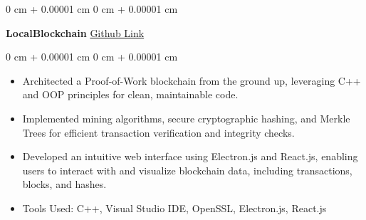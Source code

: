 \documentclass[10pt, letterpaper]{article}
\newenvironment{highlights}{
    \begin{itemize}[
        topsep=0.10 cm,
        parsep=0.10 cm,
        partopsep=0pt,
        itemsep=0pt,
        leftmargin=0 cm + 10pt
    ]
}{
    \end{itemize}
}
\newenvironment{onecolentry}{
    \begin{adjustwidth}{
        0 cm + 0.00001 cm
    }{
        0 cm + 0.00001 cm
    }
}{
    \end{adjustwidth}
}
\newenvironment{twocolentry}[2][]{
    \onecolentry
    \def\secondColumn{#2}
    \setcolumnwidth{\fill, 4.5 cm}
    \begin{paracol}{2}
}{
    \switchcolumn \raggedleft \secondColumn
    \end{paracol}
    \endonecolentry
}
\begin{document}
        \vspace{0.2 cm}

        \begin{twocolentry}{
            \href{https://github.com/anshmehta7x/SimpleBlockchain}{Github Link}
        }
            \textbf{LocalBlockchain}\end{twocolentry}

        \vspace{0.10 cm}
        \begin{onecolentry}
            \begin{highlights}
                \item Architected a Proof-of-Work blockchain from the ground up, leveraging C++ and OOP principles for clean, maintainable code. 
                \item Implemented mining algorithms, secure cryptographic hashing, and Merkle Trees for efficient transaction verification and integrity checks. 
                \item Developed an intuitive web interface using Electron.js and React.js, enabling users to interact with and visualize blockchain data, including transactions, blocks, and hashes.  
                \item Tools Used: C++, Visual Studio IDE, OpenSSL, Electron.js, React.js 
            \end{highlights}
        \end{onecolentry}
\end{document}
